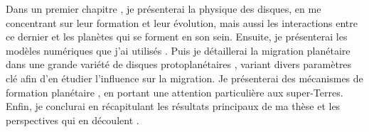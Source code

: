 Dans un premier chapitre , je présenterai la physique des disques, en me concentrant sur leur formation et leur évolution, mais aussi les interactions entre ce dernier et les planètes qui se forment en son sein. Ensuite, je
présenterai les modèles numériques que j'ai utilisés . Puis je détaillerai la migration planétaire dans une
grande variété de disques protoplanétaires , variant divers paramètres clé afin d'en étudier l'influence sur
la migration. Je présenterai des mécanismes de formation planétaire , en portant une attention particulière
aux super-Terres. Enfin, je conclurai en récapitulant les résultats principaux de ma thèse et les perspectives qui en découlent
.

